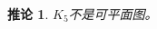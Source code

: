 \documentclass{article}
\begin{document}
\begin{CJK}{UTF8}{gbsn}
  \newtheorem*{cor}{推论}
  \Large
  \begin{cor}
       $K_5$不是可平面图。
  \end{cor}


\end{CJK}
\end{document}
